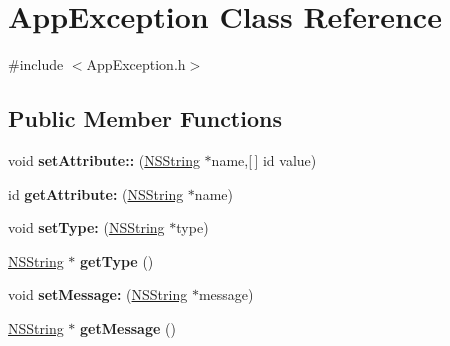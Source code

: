 \hypertarget{interface_app_exception}{
\section{\-App\-Exception \-Class \-Reference}
\label{interface_app_exception}
}


{\ttfamily \#include $<$\-App\-Exception.\-h$>$}

\subsection*{\-Public \-Member \-Functions}
\begin{DoxyCompactItemize}
\item 
\hypertarget{interface_app_exception_a6e7580c5335641f718b9ec3630d1a4d5}{
void {\bfseries set\-Attribute\-::} (\hyperlink{class_n_s_string}{\-N\-S\-String} $\ast$name,\mbox{[}$\,$\mbox{]} id value)}
\label{interface_app_exception_a6e7580c5335641f718b9ec3630d1a4d5}

\item 
\hypertarget{interface_app_exception_acb38e60def6e93cd8e9171b4e82a7e72}{
id {\bfseries get\-Attribute\-:} (\hyperlink{class_n_s_string}{\-N\-S\-String} $\ast$name)}
\label{interface_app_exception_acb38e60def6e93cd8e9171b4e82a7e72}

\item 
\hypertarget{interface_app_exception_a1cea0f9a94f1eae48fc06a00433acaa7}{
void {\bfseries set\-Type\-:} (\hyperlink{class_n_s_string}{\-N\-S\-String} $\ast$type)}
\label{interface_app_exception_a1cea0f9a94f1eae48fc06a00433acaa7}

\item 
\hypertarget{interface_app_exception_ab93141af9f4d615c6a049bca822e3282}{
\hyperlink{class_n_s_string}{\-N\-S\-String} $\ast$ {\bfseries get\-Type} ()}
\label{interface_app_exception_ab93141af9f4d615c6a049bca822e3282}

\item 
\hypertarget{interface_app_exception_a50fc6238892c31620258a6ff03521ab2}{
void {\bfseries set\-Message\-:} (\hyperlink{class_n_s_string}{\-N\-S\-String} $\ast$message)}
\label{interface_app_exception_a50fc6238892c31620258a6ff03521ab2}

\item 
\hypertarget{interface_app_exception_acf803c19c970fc4c4654776c4a856f85}{
\hyperlink{class_n_s_string}{\-N\-S\-String} $\ast$ {\bfseries get\-Message} ()}
\label{interface_app_exception_acf803c19c970fc4c4654776c4a856f85}

\end{DoxyCompactItemize}
